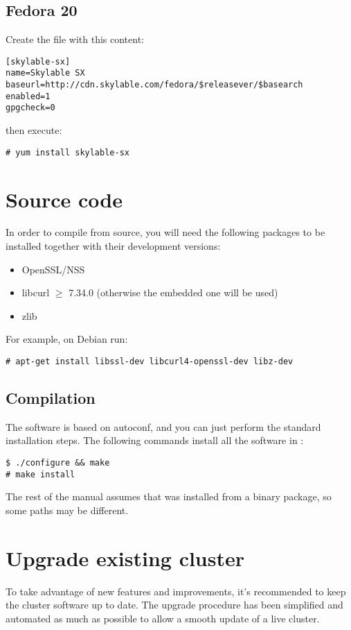 \subsection{Fedora 20}
Create the file  with this content:
\begin{lstlisting}
[skylable-sx]
name=Skylable SX
baseurl=http://cdn.skylable.com/fedora/$releasever/$basearch
enabled=1
gpgcheck=0
\end{lstlisting}
then execute:
\begin{lstlisting}
# yum install skylable-sx
\end{lstlisting}

\section{Source code}
In order to compile \SX from source, you will need the following packages to
be installed together with their development versions:
\begin{itemize}
    \item OpenSSL/NSS
    \item libcurl $\ge$ 7.34.0 (otherwise the embedded one will be used)
    \item zlib
\end{itemize}
For example, on Debian run:
\begin{lstlisting}
# apt-get install libssl-dev libcurl4-openssl-dev libz-dev
\end{lstlisting}

\subsection{Compilation}
The software is based on autoconf, and you can just perform the standard
installation steps. The following commands install all the software in
:
\begin{lstlisting}
$ ./configure && make
# make install
\end{lstlisting}
The rest of the manual assumes that \SX was installed from a binary
package, so some paths may be different.

\section{Upgrade existing cluster}
To take advantage of new features and improvements, it's recommended to
keep the cluster software up to date. The upgrade procedure has been
simplified and automated as much as possible to allow a smooth update
of a live cluster.
